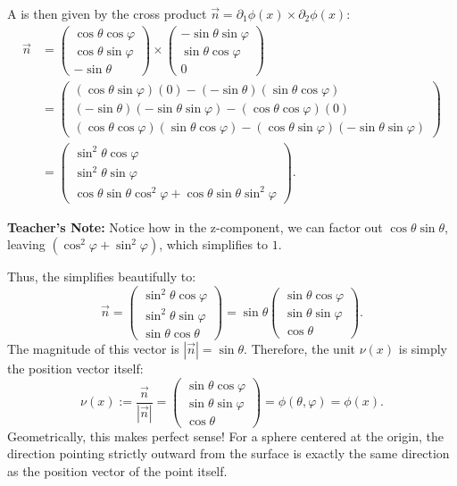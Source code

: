 \begin{example}
A  is then given by the cross product $\vec{n} = \partial_1\phi(x) \times \partial_2\phi(x)$: %
\begin{align*}
\vec{n} &= 
\begin{pmatrix}
\cos\theta \cos\varphi \\
\cos\theta \sin\varphi \\
-\sin\theta
\end{pmatrix} \times 
\begin{pmatrix}
-\sin\theta \sin\varphi \\
\sin\theta \cos\varphi \\
0
\end{pmatrix} %
\\
&= 
\begin{pmatrix}
(\cos\theta\sin\varphi)(0) - (-\sin\theta)(\sin\theta\cos\varphi) \\
(-\sin\theta)(-\sin\theta\sin\varphi) - (\cos\theta\cos\varphi)(0) \\
(\cos\theta\cos\varphi)(\sin\theta\cos\varphi) - (\cos\theta\sin\varphi)(-\sin\theta\sin\varphi)
\end{pmatrix}
\\
&= 
\begin{pmatrix}
\sin^2\theta \cos\varphi \\
\sin^2\theta \sin\varphi \\
\cos\theta\sin\theta\cos^2\varphi + \cos\theta\sin\theta\sin^2\varphi
\end{pmatrix}. %
\end{align*}

\textbf{Teacher's Note:} Notice how in the z-component, we can factor out $\cos\theta\sin\theta$, leaving $(\cos^2\varphi + \sin^2\varphi)$, which simplifies to $1$. 

Thus, the  simplifies beautifully to:
\[
\vec{n} = 
\begin{pmatrix}
\sin^2\theta \cos\varphi \\
\sin^2\theta \sin\varphi \\
\sin\theta \cos\theta
\end{pmatrix}
= \sin\theta 
\begin{pmatrix}
\sin\theta \cos\varphi \\
\sin\theta \sin\varphi \\
\cos\theta
\end{pmatrix}. %
\]
The magnitude of this vector is $|\vec{n}| = \sin\theta$. %
Therefore, the unit  $\nu(x)$ is simply the position vector itself:
\[
\nu(x) := \frac{\vec{n}}{|\vec{n}|} = 
\begin{pmatrix}
\sin\theta \cos\varphi \\
\sin\theta \sin\varphi \\
\cos\theta
\end{pmatrix}
= \phi(\theta, \varphi) = \phi(x). %
\]
Geometrically, this makes perfect sense! For a sphere centered at the origin, the direction pointing strictly outward from the surface is exactly the same direction as the position vector of the point itself.
\end{example}

